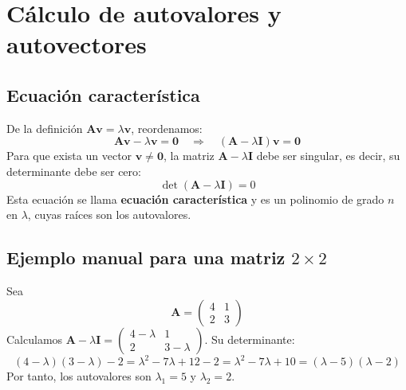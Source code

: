 \documentclass[12pt,a4paper,openany,oneside]{book}
\begin{document}
\begin{center}
\end{center}

\section{Cálculo de autovalores y autovectores}

\subsection{Ecuación característica}
De la definición $\mathbf{A}\mathbf{v} = \lambda \mathbf{v}$, reordenamos:
\[
\mathbf{A}\mathbf{v} - \lambda \mathbf{v} = \mathbf{0} \quad \Rightarrow \quad (\mathbf{A} - \lambda \mathbf{I}) \mathbf{v} = \mathbf{0}
\]
Para que exista un vector $\mathbf{v} \neq \mathbf{0}$, la matriz $\mathbf{A} - \lambda \mathbf{I}$ debe ser singular, es decir, su determinante debe ser cero:
\[
\det(\mathbf{A} - \lambda \mathbf{I}) = 0
\]
Esta ecuación se llama \textbf{ecuación característica} y es un polinomio de grado $n$ en $\lambda$, cuyas raíces son los autovalores.

\subsection{Ejemplo manual para una matriz $2\times 2$}
Sea
\[
\mathbf{A} = \begin{pmatrix} 4 & 1 \\ 2 & 3 \end{pmatrix}
\]
Calculamos $\mathbf{A} - \lambda \mathbf{I} = \begin{pmatrix} 4-\lambda & 1 \\ 2 & 3-\lambda \end{pmatrix}$.
Su determinante:
\[
(4-\lambda)(3-\lambda) - 2 = \lambda^2 - 7\lambda + 12 - 2 = \lambda^2 - 7\lambda + 10 = (\lambda - 5)(\lambda - 2)
\]
Por tanto, los autovalores son $\lambda_1 = 5$ y $\lambda_2 = 2$.
\end{document}
